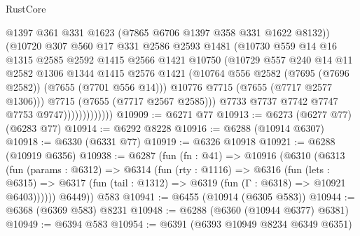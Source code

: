 \begin{lexlean}{RustCore}
\begin{coremodule}
                              @1397
                              @361
                              @331
                              @1623
                              (@7865 @6706 @1397 @358 @331 @1622 @8132))
                            (@10720
                              @307
                              @560
                              @17
                              @331
                              @2586
                              @2593
                              @1481
                              (@10730
                                @559
                                @14
                                @16
                                @1315
                                @2585
                                @2592
                                @1415
                                @2566
                                @1421
                                @10750
                                (@10729
                                  @557
                                  @240
                                  @14
                                  @11
                                  @2582
                                  @1306
                                  @1344
                                  @1415
                                  @2576
                                  @1421
                                  (@10764 @556 @2582 (@7695 (@7696 @2582)) (@7655 (@7701 @556 @14)))
                                  @10776
                                  @7715
                                  (@7655 (@7717 @2577 @1306)))
                                @7715
                                (@7655 (@7717 @2567 @2585)))
                              @7733
                              @7737
                              @7742
                              @7747
                              @7753
                              @9747)))))))))))))
@10909 := @6271 @77
@10913 := @6273 (@6277 @77) (@6283 @77)
@10914 := @6292 @8228
@10916 := @6288 (@10914 @6307)
@10918 := @6330 (@6331 @77)
@10919 := @6326 @10918
@10921 := @6288 (@10919 @6356)
@10938 := @6287
    (fun (fn : @41) =>
    @10916
      (@6310
        (@6313
          (fun (params : @6312) =>
          @6314
            (fun (rty : @1116) =>
            @6316
              (fun (lets : @6315) =>
              @6317 (fun (tail : @1312) => @6319 (fun (Γ : @6318) => @10921 @6403))))))
        @6449))
    @583
@10941 := @6455 (@10914 (@6305 @583))
@10944 := @6368 (@6369 @583) @8231
@10948 := @6288 (@6360 (@10944 @6377) @6381)
@10949 := @6394 @583
@10954 := @6391 (@6393 @10949 @8234 @6349 @6351)

\end{coremodule}
\end{lexlean}
